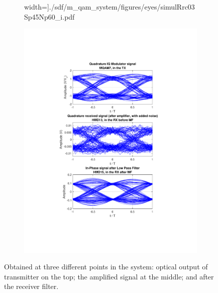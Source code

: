 \begin{refsection}
\begin{figure}[H]
\begin{minipage}{\linewidth}
\begin{subfigure}{.45\textwidth}
		width=\textwidth]{./sdf/m_qam_system/figures/eyes/simulRrc03Sp45Np60_i.pdf}
	\end{subfigure}
	\begin{subfigure}{.45\textwidth}
		\centering
		\includegraphics[clip, trim=4cm 4cm 4cm 4cm, 
		width=\textwidth]{./sdf/m_qam_system/figures/eyes/simulRrc03Sp45Np60_q.pdf}
	\end{subfigure}
	
	\caption{
		Obtained at three different points in the system: optical output of transmitter on the top;
		the amplified signal at the middle; and
		after the receiver filter.
		\label{fig:eyes_n_rrc_45_03}}
	\end{minipage}
\end{figure}




\end{refsection}
